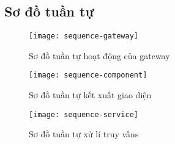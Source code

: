 \subsection{Sơ đồ tuần tự}


\begin{figure}[h!]
	\begin{center}	
		\texttt{[image: sequence-gateway]}
		\caption{Sơ đồ tuần tự hoạt động của gateway}
	\end{center}
\end{figure}


\begin{figure}[h!]
	\begin{center}	
		\texttt{[image: sequence-component]}
		\caption{Sơ đồ tuần tự kết xuất giao diện}
	\end{center}
\end{figure}

\begin{figure}[h!]
	\begin{center}	
		\texttt{[image: sequence-service]}
		\caption{Sơ đồ tuần tự xử lí truy vấns}
	\end{center}
\end{figure}

